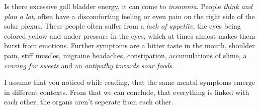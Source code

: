 \documentclass[../Book.Stress_regulation.tex]{subfiles}
\begin{document}
Is there excessive gall bladder energy, it can come to \emph{insomnia}. People \emph{think and plan a lot}, often have a discomforting feeling or even pain on the right side of the solar plexus.
These people often suffer from a \emph{lack of appetite}, the eyes being colored yellow and under pressure in the eyes, which at times almost makes them burst from emotions.
Further symptoms are a bitter taste in the mouth, shoulder pain, stiff muscles, migraine headaches, constipation, accumulations of slime, a \emph{craving for sweets} and an \emph{antipathy towards sour foods}.
	
I assume that you noticed while reading, that the same mental symptoms emerge in different contexts. From that we can conclude, that everything is linked with each other, the organs aren't seperate from each other.
\end{document}
